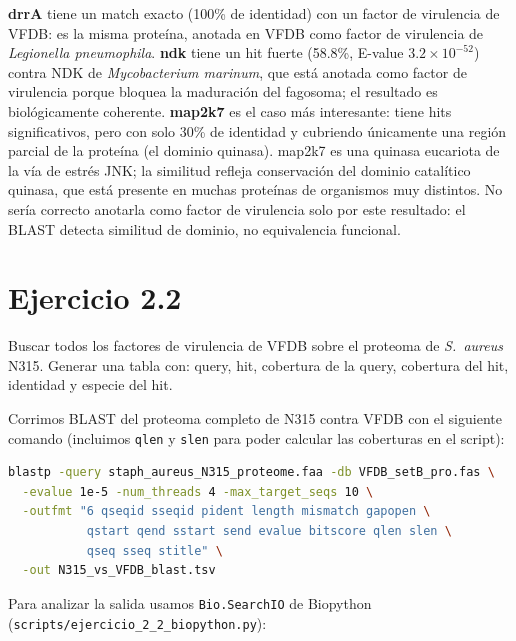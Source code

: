 \textbf{drrA} tiene un match exacto (100\% de identidad) con un factor de virulencia de VFDB: es la misma
proteína, anotada en VFDB como factor de virulencia de \textit{Legionella pneumophila}. \textbf{ndk} tiene
un hit fuerte (58.8\%, E-value $3.2 \times 10^{-52}$) contra NDK de \textit{Mycobacterium marinum}, que
está anotada como factor de virulencia porque bloquea la maduración del fagosoma; el resultado es
biológicamente coherente. \textbf{map2k7} es el caso más interesante: tiene hits significativos, pero con
solo 30\% de identidad y cubriendo únicamente una región parcial de la proteína (el dominio quinasa).
map2k7 es una quinasa eucariota de la vía de estrés JNK; la similitud refleja conservación del dominio
catalítico quinasa, que está presente en muchas proteínas de organismos muy distintos. No sería correcto
anotarla como factor de virulencia solo por este resultado: el BLAST detecta similitud de dominio, no
equivalencia funcional.

\section{Ejercicio 2.2}

\begin{consigna}
Buscar todos los factores de virulencia de VFDB sobre el proteoma de \textit{S.\ aureus} N315.
Generar una tabla con: query, hit, cobertura de la query, cobertura del hit, identidad y especie del hit.
\end{consigna}

Corrimos BLAST del proteoma completo de N315 contra VFDB con el siguiente comando (incluimos \texttt{qlen}
y \texttt{slen} para poder calcular las coberturas en el script):

\begin{lstlisting}[language=bash]
blastp -query staph_aureus_N315_proteome.faa -db VFDB_setB_pro.fas \
  -evalue 1e-5 -num_threads 4 -max_target_seqs 10 \
  -outfmt "6 qseqid sseqid pident length mismatch gapopen \
           qstart qend sstart send evalue bitscore qlen slen \
           qseq sseq stitle" \
  -out N315_vs_VFDB_blast.tsv
\end{lstlisting}

Para analizar la salida usamos \texttt{Bio.SearchIO} de Biopython
(\texttt{scripts/ejercicio\_2\_2\_biopython.py}):

